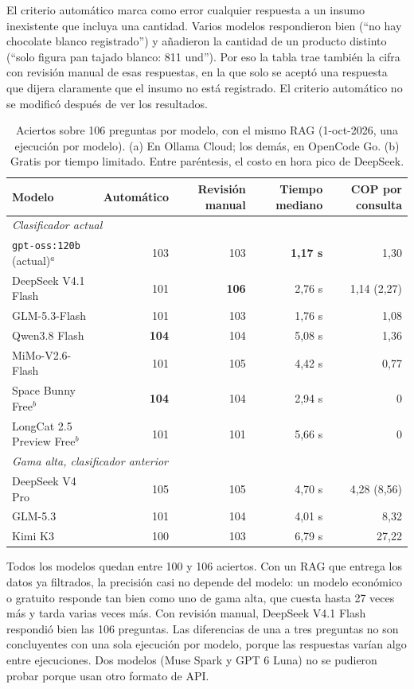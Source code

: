 \documentclass[letterpaper,11pt]{article}
\begin{document}
El criterio automático marca como error cualquier respuesta a un insumo inexistente que incluya una cantidad. Varios modelos respondieron bien (``no hay chocolate blanco registrado'') y añadieron la cantidad de un producto distinto (``solo figura pan tajado blanco: 811 und''). Por eso la tabla trae también la cifra con revisión manual de esas respuestas, en la que solo se aceptó una respuesta que dijera claramente que el insumo no está registrado. El criterio automático no se modificó después de ver los resultados.

\begin{table}[H]
\centering
\small
\begin{tabular}{lrrrr}
\toprule
Modelo & Automático & Revisión manual & Tiempo mediano & COP por consulta \\
\midrule
\multicolumn{5}{l}{\emph{Clasificador actual}} \\
\texttt{gpt-oss:120b} (actual)$^{a}$ & 103 & 103 & \textbf{1,17 s} & 1,30 \\
DeepSeek V4.1 Flash & 101 & \textbf{106} & 2,76 s & 1,14 (2,27) \\
GLM-5.3-Flash & 101 & 103 & 1,76 s & 1,08 \\
Qwen3.8 Flash & \textbf{104} & 104 & 5,08 s & 1,36 \\
MiMo-V2.6-Flash & 101 & 105 & 4,42 s & 0,77 \\
Space Bunny Free$^{b}$ & \textbf{104} & 104 & 2,94 s & 0 \\
LongCat 2.5 Preview Free$^{b}$ & 101 & 101 & 5,66 s & 0 \\
\midrule
\multicolumn{5}{l}{\emph{Gama alta, clasificador anterior}} \\
DeepSeek V4 Pro & 105 & 105 & 4,70 s & 4,28 (8,56) \\
GLM-5.3 & 101 & 104 & 4,01 s & 8,32 \\
Kimi K3 & 100 & 103 & 6,79 s & 27,22 \\
\bottomrule
\end{tabular}
\caption{Aciertos sobre 106 preguntas por modelo, con el mismo RAG (1-oct-2026, una ejecución por modelo). (a) En Ollama Cloud; los demás, en OpenCode Go. (b) Gratis por tiempo limitado. Entre paréntesis, el costo en hora pico de DeepSeek.}
\end{table}

Todos los modelos quedan entre 100 y 106 aciertos. Con un RAG que entrega los datos ya filtrados, la precisión casi no depende del modelo: un modelo económico o gratuito responde tan bien como uno de gama alta, que cuesta hasta 27 veces más y tarda varias veces más. Con revisión manual, DeepSeek V4.1 Flash respondió bien las 106 preguntas. Las diferencias de una a tres preguntas no son concluyentes con una sola ejecución por modelo, porque las respuestas varían algo entre ejecuciones. Dos modelos (Muse Spark y GPT 6 Luna) no se pudieron probar porque usan otro formato de API.
\end{document}
